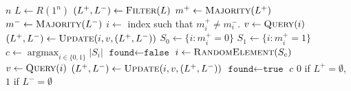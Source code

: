 \Input $n$
\Program
\State $L \gets R(1^n)$
\State $(L^+, L^-) \gets \Call{Filter}{L}$ 
    \State $m^+ \gets \Call{Majority}{L^+}$
    \State $m^- \gets \Call{Majority}{L^-}$
        \State $i \gets $ index such that $m^+_i \neq m^-_i$.
        \State $v \gets \Call{Query}{i}$
        \State $(L^+, L^-) \gets \Call{Update}{i, v, (L^+, L^-)}$ 
    \Else
        \State $S_0 \gets \{i : m^+_i = 0\}$
        \State $S_1 \gets \{i : m^+_i = 1\}$
        \State $c \gets \operatorname*{argmax}_{i\in\{0, 1\}} |S_i|$
        \State $\texttt{found} \gets \texttt{false}$
            \State $i \gets \Call{RandomElement}{S_c}$
            \State $v \gets \Call{Query}{i}$
            \State $(L^+, L^-) \gets \Call{Update}{i, v, (L^+, L^-)}$ 
                \State $\texttt{found} \gets \texttt{true}$
            \EndIf
        \EndRepeatTimes
            \Output $c$
            \Halt
        \EndIf
    \EndIf
\EndWhile
\Output $0$ if $L^+ = \emptyset$, $1$ if $L^- = \emptyset$
\Halt